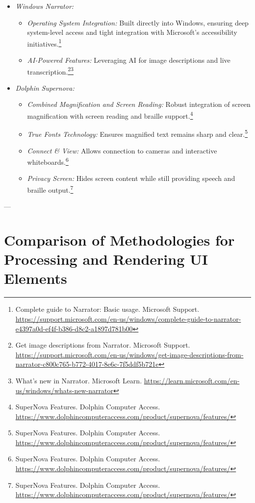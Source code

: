 \begin{itemize}
\begin{itemize}
    \end{itemize}
    \item \emph{Windows Narrator:}
    \begin{itemize}
        \item \emph{Operating System Integration:} Built directly into Windows, ensuring deep system-level access and tight integration with Microsoft's accessibility initiatives.\footnote{Complete guide to Narrator: Basic usage. Microsoft Support. \url{https://support.microsoft.com/en-us/windows/complete-guide-to-narrator-e4397a0d-ef4f-b386-d8c2-a1897d781b00}}
        \item \emph{AI-Powered Features:} Leveraging AI for image descriptions and live transcription.\footnote{Get image descriptions from Narrator. Microsoft Support. \url{https://support.microsoft.com/en-us/windows/get-image-descriptions-from-narrator-c800c765-b772-4017-8e6c-7f5ddf5b721e}}\footnote{What's new in Narrator. Microsoft Learn. \url{https://learn.microsoft.com/en-us/windows/whats-new-narrator}}
    \end{itemize}
    \item \emph{Dolphin Supernova:}
    \begin{itemize}
        \item \emph{Combined Magnification and Screen Reading:} Robust integration of screen magnification with screen reading and braille support.\footnote{SuperNova Features. Dolphin Computer Access. \url{https://www.dolphincomputeraccess.com/product/supernova/features/}}
        \item \emph{True Fonts Technology:} Ensures magnified text remains sharp and clear.\footnote{SuperNova Features. Dolphin Computer Access. \url{https://www.dolphincomputeraccess.com/product/supernova/features/}}
        \item \emph{Connect \& View:} Allows connection to cameras and interactive whiteboards.\footnote{SuperNova Features. Dolphin Computer Access. \url{https://www.dolphincomputeraccess.com/product/supernova/features/}}
        \item \emph{Privacy Screen:} Hides screen content while still providing speech and braille output.\footnote{SuperNova Features. Dolphin Computer Access. \url{https://www.dolphincomputeraccess.com/product/supernova/features/}}
    \end{itemize}
\end{itemize}

---

\section{Comparison of Methodologies for Processing and Rendering UI Elements}
\label{sec:comparison-methodologies}

